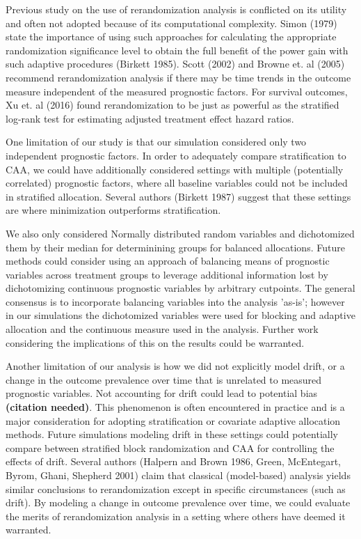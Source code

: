 Previous study on the use of rerandomization analysis is conflicted on its utility and often not adopted because of its computational complexity.
Simon (1979) state the importance of using such approaches for calculating the appropriate randomization significance level to obtain the full benefit of the power gain with such adaptive procedures (Birkett 1985).
Scott (2002) and Browne et. al (2005) recommend rerandomization analysis if there may be time trends in the outcome measure independent of the measured prognostic factors.
For survival outcomes, Xu et. al (2016) found rerandomization to be just as powerful as the stratified log-rank test for estimating adjusted treatment effect hazard ratios.


One limitation of our study is that our simulation considered only two independent prognostic factors.
In order to adequately compare stratification to CAA, we could have additionally considered settings with multiple (potentially correlated) prognostic factors, where all baseline variables could not be included in stratified allocation.  
Several authors (Birkett 1987) suggest that these settings are where minimization outperforms stratification.

We also only considered Normally distributed random variables and dichotomized them by their median for determinining groups for balanced allocations.
Future methods could consider using an approach of balancing means of prognostic variables across treatment groups to leverage additional information lost by dichotomizing continuous prognostic variables by arbitrary cutpoints.
The general consensus is to incorporate balancing variables into the analysis 'as-is'; however in our simulations the dichotomized variables were used for blocking and adaptive allocation and the continuous measure used in the analysis.
Further work considering the implications of this on the results could be warranted.

Another limitation of our analysis is how we did not explicitly model drift, or a change in the outcome prevalence over time that is unrelated to measured prognostic variables.
Not accounting for drift could lead to potential bias \textbf{(citation needed)}.
This phenomenon is often encountered in practice and is a major consideration for adopting stratification or covariate adaptive allocation methods.
Future simulations modeling drift in these settings could potentially compare between stratified block randomization and CAA for controlling the effects of drift.
Several authors (Halpern and Brown 1986, Green, McEntegart, Byrom, Ghani, Shepherd 2001) claim that classical (model-based) analysis yields similar conclusions to rerandomization except in specific circumstances (such as drift).
By modeling a change in outcome prevalence over time, we could evaluate the merits of rerandomization analysis in a setting where others have deemed it warranted. 


